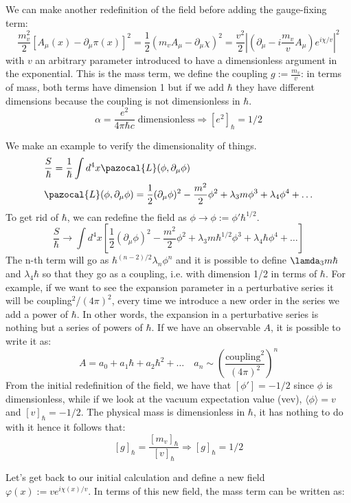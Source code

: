 \documentclass[../main.tex]{subfiles}
\begin{document}
We can make another redefinition of the field before adding the gauge-fixing term:
\[
\frac{m_v^2}{2}[A_\mu(x)-\partial_\mu\pi(x)]^2=\frac{1}{2}(m_vA_\mu-\partial_\mu\chi)^2=\frac{v^2}{2}\left|\left(\partial_\mu-i\frac{m_v}{v}A_\mu\right)e^{i\chi/v}\right|^2
\]
with $v$ an arbitrary parameter introduced to have a dimensionless argument in the exponential. This is the mass term, we define the coupling $g:=\frac{m_v}{v}$: in terms of mass, both terms have dimension 1 but if we add $\hbar$ they have different dimensions because the coupling is not dimensionless in $\hbar$.
\[
\alpha=\frac{e^2}{4\pi\hbar c} \;\text{dimensionless}\Rightarrow[e^2]_\hbar=1/2
\]
\begin{example} We make an example to verify the dimensionality of things.
\begin{align*}
&\frac{S}{\hbar}=\frac{1}{\hbar}\int d^4x\pazocal{L}(\phi,\partial_\mu\phi)\\
&\pazocal{L}(\phi,\partial_\mu\phi)=\frac{1}{2}(\partial_\mu\phi)^2-\frac{m^2}{2}\phi^2+\lambda_3m\phi^3+\lambda_4\phi^4+\dots
\end{align*}
To get rid of $\hbar$, we can redefine the field as $\phi\to\phi:=\phi'\hbar^{1/2}$.
\[
\frac{S}{\hbar}\to\int d^4x\left[\frac{1}{2}(\partial_\mu\phi)^2-\frac{m^2}{2}\phi^2+\lambda_3m\hbar^{1/2}\phi^3+\lambda_4\hbar\phi^4+\dots\right]
\]
The n-th term will go as $\hbar^{(n-2)/2}\lambda_n\phi^n$ and it is possible to define $\lamda_3m\hbar$ and $\lambda_4\hbar$ so that they go as a coupling, i.e. with dimension 1/2 in terms of $\hbar$. For example, if we want to see the expansion parameter in a perturbative series it will be coupling$^2$/$(4\pi)^2$, every time we introduce a new order in the series we add a power of $\hbar$. In other words, the expansion in a perturbative series is nothing but a series of powers of $\hbar$. If we have an observable $A$, it is possible to write it as:
\[
A=a_0+a_1\hbar+a_2\hbar^2+\dots \quad a_n\sim\left(\frac{\text{coupling}^2}{(4\pi)^2}\right)^n
\]
From the initial redefinition of the field, we have that $[\phi']=-1/2$ since $\phi$ is dimensionless, while if we look at the vacuum expectation value (vev), $\langle\phi\rangle=v$ and $[v]_\hbar=-1/2$. The physical mass is dimensionless in $\hbar$, it has nothing to do with it hence it follows that:
\[
[g]_\hbar=\frac{[m_v]_\hbar}{[v]_\hbar}\Rightarrow[g]_\hbar=1/2
\]
\end{example}
Let's get back to our initial calculation and define a new field\\
$\varphi(x):=ve^{i\chi(x)/v}$. In terms of this new field, the mass term can be written as:
\end{document}
